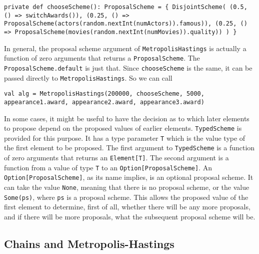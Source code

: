\begin{flushleft}
\texttt{private def chooseScheme(): ProposalScheme = \{ 
\newline \tab DisjointScheme(
\newline \tab (0.5, () => switchAwards()), 
\newline \tab (0.25, () => 
\newline \tab ProposalScheme(actors(random.nextInt(numActors)).famous)), 
\newline \tab (0.25, () =>
\newline \tab ProposalScheme(movies(random.nextInt(numMovies)).quality))
\newline )
\newline \}
}
\end{flushleft}

In general, the proposal scheme argument of \texttt{MetropolisHastings} is actually a function of zero arguments that returns a \texttt{ProposalScheme}. The \texttt{ProposalScheme.default} is just that. Since \texttt{chooseScheme} is the same, it can be passed directly to \texttt{MetropolisHastings}. So we can call

\begin{flushleft}
\texttt{val alg =
\newline \tab MetropolisHastings(200000, chooseScheme, 5000, appearance1.award, appearance2.award, appearance3.award) }
\end{flushleft}

In some cases, it might be useful to have the decision as to which later elements to propose depend on the proposed values of earlier elements. \texttt{TypedScheme} is provided for this purpose. It has a type parameter \texttt{T} which is the value type of the first element to be proposed. The first argument to \texttt{TypedScheme} is a function of zero arguments that returns an \texttt{Element[T]}. The second argument is a function from a value of type \texttt{T} to an \texttt{Option[ProposalScheme]}. An \texttt{Option[Proposal\-Scheme]}, as its name implies, is an optional proposal scheme. It can take the value \texttt{None}, meaning that there is no proposal scheme, or the value \texttt{Some(ps)}, where \texttt{ps} is a proposal scheme. This allows the proposed value of the first element to determine, first of all, whether there will be any more proposals, and if there will be more proposals, what the subsequent proposal scheme will be.

\subsection{Chains and Metropolis-Hastings}

